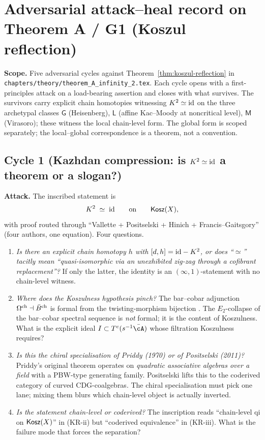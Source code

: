 \section{Adversarial attack--heal record on Theorem A / G1 (Koszul reflection)}
\label{wn:sec:wave17-opus-G1}

\textbf{Scope.} Five adversarial cycles against
Theorem~\ref{thm:koszul-reflection} in
\texttt{chapters/theory/theorem\_A\_infinity\_2.tex}. Each cycle opens
with a first-principles attack on a load-bearing assertion and closes
with what survives. The survivors carry explicit chain homotopies
witnessing $K^{2}\simeq\mathrm{id}$ on the three archetypal classes
$\mathsf{G}$ (Heisenberg), $\mathsf{L}$ (affine Kac--Moody at
noncritical level), $\mathsf{M}$ (Virasoro); these witness the local
chain-level form. The global form is scoped separately; the
local--global correspondence is a theorem, not a convention.

\subsection*{Cycle 1 (Kazhdan compression: is $K^{2}\simeq\mathrm{id}$ a theorem or a slogan?)}

\textbf{Attack.} The inscribed statement is
\[
K^{2}\;\simeq\;\mathrm{id}\qquad\text{on}\qquad\mathsf{Kosz}(X),
\]
with proof routed through ``Vallette + Positselski + Hinich +
Francis--Gaitsgory'' (four authors, one equation). Four questions.

\begin{enumerate}
\item[Q1.1] \emph{Is there an explicit chain homotopy $h$ with
$[d,h] = \mathrm{id} - K^{2}$, or does ``$\simeq$'' tacitly mean
``quasi-isomorphic via an unexhibited zig-zag through a cofibrant
replacement''?} If only the latter, the identity is an
$(\infty,1)$-statement with no chain-level witness.
\item[Q1.2] \emph{Where does the Koszulness hypothesis pinch?}
The bar--cobar adjunction $\Omega^{\mathrm{ch}}\dashv\bar{B}^{\mathrm{ch}}$ is formal from the
twisting-morphism bijection \cite[Thm.\ 2.2.9]{LV12}. The
$E_{2}$-collapse of the bar--cobar spectral sequence is \emph{not}
formal; it is the content of Koszulness. What is the explicit ideal
$I\subset T^{c}(s^{-1}\bar\cA)$ whose filtration Koszulness requires?
\item[Q1.3] \emph{Is this the chiral specialisation of Priddy
(1970) or of Positselski (2011)?} Priddy's original theorem operates
on \emph{quadratic associative algebras over a field} with a PBW-type
generating family. Positselski lifts this to the coderived
category of curved CDG-coalgebras. The chiral specialisation must
pick one lane; mixing them blurs which chain-level object is actually
inverted.
\item[Q1.4] \emph{Is the statement chain-level or coderived?} The
inscription reads ``chain-level qi on $\mathsf{Kosz}(X)$'' in (KR-ii) but
``coderived equivalence'' in (KR-iii). What is the failure mode that
forces the separation?
\end{enumerate}


